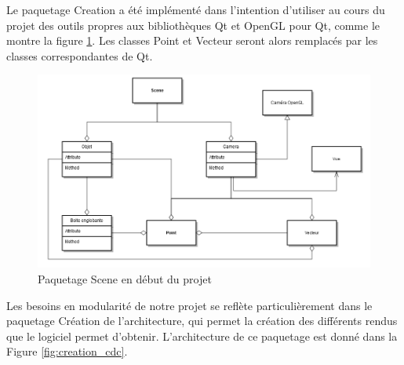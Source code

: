         Le paquetage Creation a été implémenté dans l'intention d'utiliser au cours du projet des outils propres aux bibliothèques Qt et OpenGL pour Qt, comme le montre la figure \ref{fig:scene_cdc}. Les classes Point et Vecteur seront alors remplacés par les classes correspondantes de Qt.

\begin{figure}[h]
	\centering      
	\includegraphics[scale=0.5]{old_scene.png}
	\caption{\label{fig:scene_cdc}  Paquetage Scene en début du projet \protect \footnotemark }
\end{figure}

        Les besoins en modularité de notre projet se reflète particulièrement dans le paquetage Création de l'architecture, qui permet la création des différents rendus que le logiciel permet d'obtenir. L'architecture de ce paquetage est donné dans la Figure \ref{fig:creation_cdc}.

